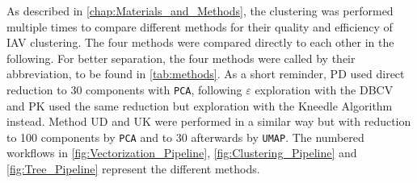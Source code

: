 
\vspace{1em}

As described in \autoref{chap:Materials_and_Methods}, the clustering was performed multiple times to compare different methods for their quality and efficiency of \gls{IAV} clustering. The four methods were compared directly to each other in the following. For better separation, the four methods were called by their abbreviation, to be found in \autoref{tab:methods}. As a short reminder, PD used direct reduction to 30 components with \texttt{PCA}, following $\varepsilon$ exploration with the \gls{DBCV} and PK used the same reduction but exploration with the Kneedle Algorithm instead. Method UD and UK were performed in a similar way but with reduction to 100 components by \texttt{PCA} and to 30 afterwards by \texttt{UMAP}. The numbered workflows in \autoref{fig:Vectorization_Pipeline}, \autoref{fig:Clustering_Pipeline} and \autoref{fig:Tree_Pipeline} represent the different methods.

